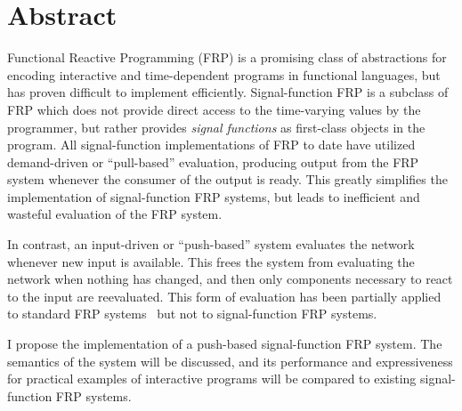\section*{Abstract}
Functional Reactive Programming (FRP) is a promising class of abstractions for encoding interactive and time-dependent programs in
functional languages, but has proven difficult to implement efficiently. Signal-function FRP is a subclass of FRP which does not provide
direct access to the time-varying  values by the programmer, but rather provides {\em signal functions} as first-class objects in the
program. All signal-function implementations of FRP to date have utilized demand-driven or ``pull-based''  evaluation, producing output from
the FRP system whenever the consumer of the output is ready. This greatly simplifies the implementation of signal-function FRP systems, but
leads to inefficient and wasteful evaluation of the FRP system.

In contrast, an input-driven or ``push-based'' system evaluates the network whenever new input is available. This frees the system from
evaluating the network when nothing has changed, and then only components necessary to react to the input are reevaluated.
This form of evaluation has been partially applied to standard FRP systems~\cite{Elliott2009} but not to signal-function FRP systems.

I propose the implementation of a push-based signal-function FRP system. The semantics of the system will be discussed, and its performance
and expressiveness for practical examples of interactive programs will be compared to existing signal-function FRP systems. 
